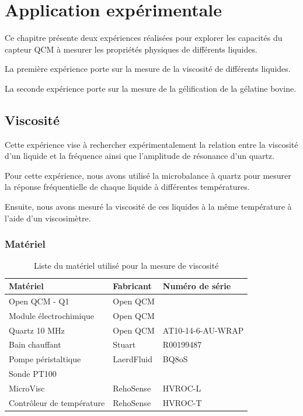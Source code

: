 \chapter{Application expérimentale}
\label{chap:application_experimentale}

Ce chapitre présente deux expériences réalisées pour explorer les capacités du capteur QCM à mesurer les propriétés physiques de différents liquides.

La première expérience porte sur la mesure de la viscosité de différents liquides.

La seconde expérience porte sur la mesure de la gélification de la gélatine bovine.


\section{Viscosité}

Cette expérience vise à rechercher expérimentalement la relation entre la viscosité d'un liquide et la fréquence ainsi que l'amplitude de résonance d'un quartz.

Pour cette expérience, nous avons utilisé la microbalance à quartz pour mesurer la réponse fréquentielle de chaque liquide à différentes températures.

Ensuite, nous avons mesuré la viscosité de ces liquides à la même température à l'aide d'un viscosimètre.

\subsection{Matériel}
 
\begin{table}[H]
    \centering
    \begin{tabular}{|l|l|l|}
        \hline
        \textbf{Matériel}         & \textbf{Fabricant}   & \textbf{Numéro de série} \\
        \hline
        Open QCM - Q1            & Open QCM              &   \\
        Module électrochimique   & Open QCM              &   \\
        Quartz 10 MHz            & Open QCM              & AT10-14-6-AU-WRAP  \\
        Bain chauffant          & Stuart                & R00199487 \\
        Pompe péristaltique     & LaerdFluid            & BQ8oS     \\
        Sonde PT100             &                       &   \\
        MicroVisc               & RehoSense             & HVROC-L   \\
        Contrôleur de température & RehoSense           & HVROC-T   \\
        \hline
    \end{tabular}
    \caption{Liste du matériel utilisé pour la mesure de viscosité}
    \label{tab:MatérielViscosité}
\end{table}

